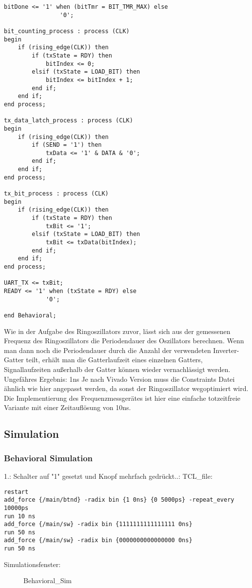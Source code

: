 \documentclass{article}
\begin{document}
\begin{verbatim}
bitDone <= '1' when (bitTmr = BIT_TMR_MAX) else
				'0';

bit_counting_process : process (CLK)
begin
	if (rising_edge(CLK)) then
		if (txState = RDY) then
			bitIndex <= 0;
		elsif (txState = LOAD_BIT) then
			bitIndex <= bitIndex + 1;
		end if;
	end if;
end process;

tx_data_latch_process : process (CLK)
begin
	if (rising_edge(CLK)) then
		if (SEND = '1') then
			txData <= '1' & DATA & '0';
		end if;
	end if;
end process;

tx_bit_process : process (CLK)
begin
	if (rising_edge(CLK)) then
		if (txState = RDY) then
			txBit <= '1';
		elsif (txState = LOAD_BIT) then
			txBit <= txData(bitIndex);
		end if;
	end if;
end process;

UART_TX <= txBit;
READY <= '1' when (txState = RDY) else
			'0';

end Behavioral;
\end{verbatim}
Wie in der Aufgabe des Ringoszillators zuvor, l\"asst sich aus der gemessenen Frequenz des Ringoszillators die Periodendauer des Oszillators berechnen. Wenn man dann noch die Periodendauer durch die Anzahl der verwendeten Inverter-Gatter teilt, erhält man die Gatterlaufzeit eines einzelnen Gatters, Signallaufzeiten au{\ss}erhalb der Gatter k\"onnen wieder vernachl\"assigt werden. \newline
Ungef\"ahres Ergebnis: 1ns\newline
Je nach Vivado Version muss die Constraints Datei \"ahnlich wie hier angepasst werden, da sonst der Ringoszillator wegoptimiert wird.\newline
Die Implementierung des Frequenzmessger\"ates ist hier eine einfache totzeitfreie Variante mit einer Zeitaufl\"osung von 10ns.

\subsection{Simulation}
\subsubsection{Behavioral Simulation}
1.: Schalter auf "1" gesetzt und Knopf mehrfach gedr\"uckt..: \newline
TCL\_file:\newline
\begin{verbatim}
restart
add_force {/main/btnd} -radix bin {1 0ns} {0 5000ps} -repeat_every 10000ps
run 10 ns
add_force {/main/sw} -radix bin {1111111111111111 0ns}
run 50 ns
add_force {/main/sw} -radix bin {0000000000000000 0ns}
run 50 ns
\end{verbatim}
Simulationsfenster:\newline
\begin{figure}[H]
\begin{center}
\caption{Behavioral\_Sim}
\end{center}
\end{figure}
\end{document}
